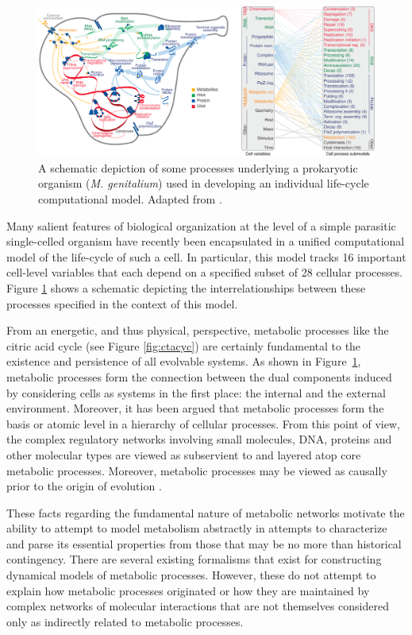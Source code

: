 \begin{figure}
\begin{center}
\noindent\includegraphics[width=0.95\columnwidth]{fig/cellprocessesdiagram.pdf}
\end{center}
\caption{A schematic depiction of some processes underlying a prokaryotic organism (\emph{M. genitalium}) used in developing an individual life-cycle computational model. Adapted from \cite{Karr2012}.}
\label{fig:cellprocess}
\end{figure}
Many salient features of biological organization at the level of a simple parasitic single-celled organism have recently been encapsulated in a unified computational model of the life-cycle of such a cell. In particular, this model tracks 16 important cell-level variables that each depend on a specified subset of 28 cellular processes. Figure \ref{fig:cellprocess} shows a schematic depicting the interrelationships between these processes specified in the context of this model.

From an energetic, and thus physical, perspective, metabolic processes like the citric acid cycle (see Figure \ref{fig:ctacyc}) are certainly fundamental to the existence and persistence of all evolvable systems. As shown in Figure~\ref{fig:cellprocess}, metabolic processes form the connection between the dual components induced by considering cells as systems in the first place: the internal and the external environment. Moreover, it has been argued that metabolic processes form the basis or atomic level in a hierarchy of cellular processes. From this point of view, the complex regulatory networks involving small molecules, DNA, proteins and other molecular types are viewed as subservient to and layered atop core metabolic processes. Moreover, metabolic processes may be viewed as causally prior to the origin of evolution \cite{Braakman2012,Braakman2012a}.

These facts regarding the fundamental nature of metabolic networks motivate the ability to attempt to model metabolism abstractly in attempts to characterize and parse its essential properties from those that may be no more than historical contingency. There are several existing formalisms that exist for constructing dynamical models of metabolic processes. However, these do not attempt to explain how metabolic processes originated or how they are maintained by complex networks of molecular interactions that are not themselves considered only as indirectly related to metabolic processes.

